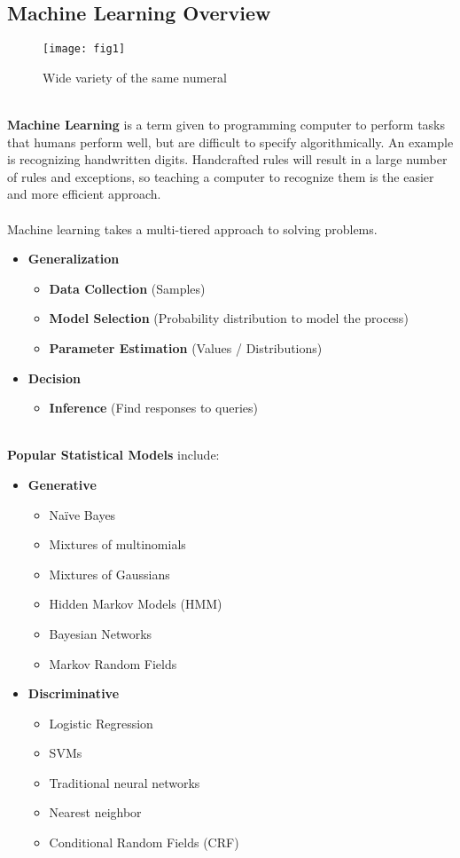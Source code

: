 \documentclass[11pt]{article} %
\begin{document}
\subsection{Machine Learning Overview}
\begin{wrapfigure}{r}{0.5\textwidth}
	\centering
		\texttt{[image: fig1]}
	\caption{Wide variety of the same numeral}
\end{wrapfigure}
~\\
{\bf Machine Learning} is a term given to programming computer to perform tasks that humans perform well, but are difficult to specify algorithmically.  An example is recognizing handwritten digits. Handcrafted rules will result in a large number of rules and exceptions, so teaching a computer to recognize them is the easier and more efficient approach.\\
~\\
Machine learning takes a multi-tiered approach to solving problems.
\begin{itemize}
\itemsep -2pt
\item {\bf Generalization}
\begin{itemize}
\itemsep -2pt
\item {\bf Data Collection} (Samples)
\item {\bf Model Selection} (Probability distribution to model the process)
\item {\bf Parameter Estimation} (Values / Distributions)
\end{itemize}
\item {\bf Decision}
\begin{itemize}
\itemsep -2pt
\item {\bf Inference} (Find responses to queries)
\end{itemize}
\end{itemize}
~\\
{\bf Popular Statistical Models} include:
\begin{itemize}
\itemsep -2pt
\item {\bf Generative}
\begin{itemize}
\itemsep -2pt
\item Na\"ive Bayes
\item Mixtures of multinomials
\item Mixtures of Gaussians
\item Hidden Markov Models (HMM)
\item Bayesian Networks
\item Markov Random Fields
\end{itemize}
\item {\bf Discriminative}
\begin{itemize}
\itemsep -2pt
\item Logistic Regression
\item SVMs
\item Traditional neural networks
\item Nearest neighbor
\item Conditional Random Fields (CRF)
\end{itemize}
\end{itemize}
\end{document}
